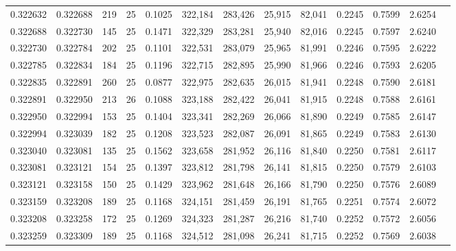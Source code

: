 \begin{tabular}{rrrrrrrrrrrrr}
0.322632 & 0.322688 &   219 &  25 &                                     0.1025 & 322,184 & 283,426 &  25,915 &  82,041 & 0.2245 & 0.7599 & 2.6254 \\
0.322688 & 0.322730 &   145 &  25 &                                     0.1471 & 322,329 & 283,281 &  25,940 &  82,016 & 0.2245 & 0.7597 & 2.6240 \\
0.322730 & 0.322784 &   202 &  25 &                                     0.1101 & 322,531 & 283,079 &  25,965 &  81,991 & 0.2246 & 0.7595 & 2.6222 \\
0.322785 & 0.322834 &   184 &  25 &                                     0.1196 & 322,715 & 282,895 &  25,990 &  81,966 & 0.2246 & 0.7593 & 2.6205 \\
0.322835 & 0.322891 &   260 &  25 &                                     0.0877 & 322,975 & 282,635 &  26,015 &  81,941 & 0.2248 & 0.7590 & 2.6181 \\
0.322891 & 0.322950 &   213 &  26 &                                     0.1088 & 323,188 & 282,422 &  26,041 &  81,915 & 0.2248 & 0.7588 & 2.6161 \\
0.322950 & 0.322994 &   153 &  25 &                                     0.1404 & 323,341 & 282,269 &  26,066 &  81,890 & 0.2249 & 0.7585 & 2.6147 \\
0.322994 & 0.323039 &   182 &  25 &                                     0.1208 & 323,523 & 282,087 &  26,091 &  81,865 & 0.2249 & 0.7583 & 2.6130 \\
0.323040 & 0.323081 &   135 &  25 &                                     0.1562 & 323,658 & 281,952 &  26,116 &  81,840 & 0.2250 & 0.7581 & 2.6117 \\
0.323081 & 0.323121 &   154 &  25 &                                     0.1397 & 323,812 & 281,798 &  26,141 &  81,815 & 0.2250 & 0.7579 & 2.6103 \\
0.323121 & 0.323158 &   150 &  25 &                                     0.1429 & 323,962 & 281,648 &  26,166 &  81,790 & 0.2250 & 0.7576 & 2.6089 \\
0.323159 & 0.323208 &   189 &  25 &                                     0.1168 & 324,151 & 281,459 &  26,191 &  81,765 & 0.2251 & 0.7574 & 2.6072 \\
0.323208 & 0.323258 &   172 &  25 &                                     0.1269 & 324,323 & 281,287 &  26,216 &  81,740 & 0.2252 & 0.7572 & 2.6056 \\
0.323259 & 0.323309 &   189 &  25 &                                     0.1168 & 324,512 & 281,098 &  26,241 &  81,715 & 0.2252 & 0.7569 & 2.6038 \\

\end{tabular}
